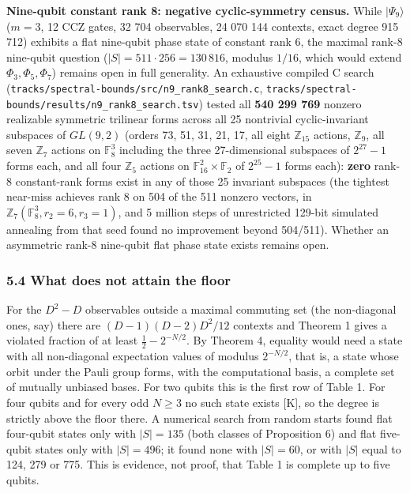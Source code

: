 \documentclass[11pt,a4paper]{article}
\begin{document}
\textbf{Nine-qubit constant rank 8: negative cyclic-symmetry census.} While \(|\Psi_9\rangle\) (\(m=3\), 12 CCZ
gates, 32 704 observables, 24 070 144 contexts, exact degree 915 712) exhibits a flat nine-qubit phase
state of constant rank 6, the maximal rank-8 nine-qubit question (\(|S| = 511 \cdot 256 = 130\,816\),
modulus \(1/16\), which would extend \(\Phi_3, \Phi_5, \Phi_7\)) remains open in full generality. An
exhaustive compiled C search (\nolinkurl{tracks/spectral-bounds/src/n9_rank8_search.c}, \nolinkurl{tracks/spectral-bounds/results/n9_rank8_search.tsv}) tested all
\textbf{540 299 769} nonzero realizable symmetric trilinear forms across all 25 nontrivial cyclic-invariant
subspaces of \(GL(9,2)\) (orders 73, 51, 31, 21, 17, all eight \(\mathbb{Z}_{15}\) actions, \(\mathbb{Z}_9\),
all seven \(\mathbb{Z}_7\) actions on \(\mathbb{F}_8^3\) including the three 27-dimensional subspaces of
\(2^{27}-1\) forms each, and all four \(\mathbb{Z}_5\) actions on \(\mathbb{F}_{16}^2 \times \mathbb{F}_2\)
of \(2^{25}-1\) forms each): \textbf{zero} rank-8 constant-rank forms exist in any of those 25 invariant
subspaces (the tightest near-miss achieves rank 8 on 504 of the 511 nonzero vectors, in
\(\mathbb{Z}_7(\mathbb{F}_8^3, r_2=6, r_3=1)\), and 5 million steps of unrestricted 129-bit simulated
annealing from that seed found no improvement beyond 504/511). Whether an asymmetric rank-8 nine-qubit
flat phase state exists remains open.

\subsubsection{5.4 What does not attain the floor}\label{54-what-does-not-attain-the-floor}

For the \(D^2 - D\) observables outside a maximal commuting set (the
non-diagonal ones, say) there are \((D-1)(D-2)D^2/12\) contexts and Theorem 1 gives a violated fraction of
at least \(\tfrac12 - 2^{-N/2}\). By Theorem 4, equality would need a state with all non-diagonal
expectation values of modulus \(2^{-N/2}\), that is, a state whose orbit under the Pauli group forms,
with the computational basis, a complete set of mutually unbiased bases. For two qubits this is the
first row of Table 1. For four qubits and for every odd \(N \ge 3\) no such state exists {[}K{]}, so the
degree is strictly above the floor there. A numerical search from random starts found flat four-qubit
states only with \(|S| = 135\) (both classes of Proposition 6) and flat five-qubit states only with
\(|S| = 496\); it found none with \(|S| = 60\), or with \(|S|\) equal to 124, 279 or 775. This is evidence, not
proof, that Table 1 is complete up to five qubits.
\end{document}
